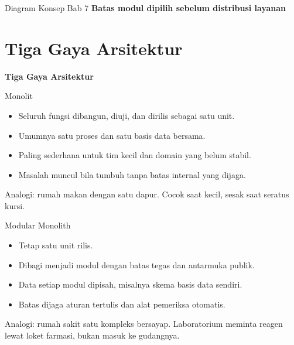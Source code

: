 \documentclass[aspectratio=169, table, 12pt]{beamer}
\begin{document}
\begin{frame}{{\Large Diagram Konsep Bab 7}}
  \centering
  {\small\bfseries Batas modul dipilih sebelum distribusi layanan}\par\medskip
\end{frame}

\section{Tiga Gaya Arsitektur}

\begin{frame}{\hfill}
  \centering
  \Huge{\textbf{Tiga Gaya Arsitektur}}
\end{frame}

\begin{frame}{{\Large Monolit}}
  \vspace{10pt}
  \begin{itemize}
    \item Seluruh fungsi dibangun, diuji, dan dirilis sebagai satu unit.
    \item Umumnya satu proses dan satu basis data bersama.
    \item Paling sederhana untuk tim kecil dan domain yang belum stabil.
    \item Masalah muncul bila tumbuh tanpa batas internal yang dijaga.
  \end{itemize}
  \vspace{6pt}
  {\small Analogi: rumah makan dengan satu dapur. Cocok saat kecil, sesak saat seratus kursi.}
\end{frame}

\begin{frame}{{\Large Modular Monolith}}
  \vspace{10pt}
  \begin{itemize}
    \item Tetap satu unit rilis.
    \item Dibagi menjadi modul dengan batas tegas dan antarmuka publik.
    \item Data setiap modul dipisah, misalnya skema basis data sendiri.
    \item Batas dijaga aturan tertulis dan alat pemeriksa otomatis.
  \end{itemize}
  \vspace{6pt}
  {\small Analogi: rumah sakit satu kompleks bersayap. Laboratorium meminta reagen lewat loket
  farmasi, bukan masuk ke gudangnya.}
\end{frame}
\end{document}
